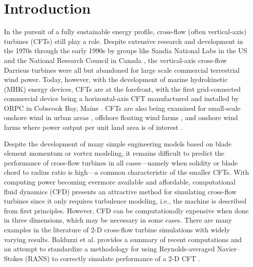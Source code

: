 \documentclass[aip,graphicx]{revtex4-1}
\begin{document}
\pacs{}%

\maketitle %
\listoftodos

\section{Introduction}

In the pursuit of a fully sustainable energy profile, cross-flow (often
vertical-axis) turbines (CFTs) still play a role. Despite extensive research and
development in the 1970s through the early 1990s by groups like Sandia National
Labs in the US \cite{Sutherland2012} and the National Research Council in Canada
\cite{Para2002}, the vertical-axis cross-flow Darrieus turbines were all but
abandoned for large scale commercial terrestrial wind power. Today, however,
with the development of marine hydrokinetic (MHK) energy devices, CFTs are at
the forefront, with the first grid-connected commercial device being a
horizontal-axis CFT manufactured and installed by ORPC in Cobscook Bay, Maine
\cite{ORPC2012}. CFTs are also being examined for small-scale onshore wind in
urban areas \cite{Lott2015}, offshore floating wind farms \cite{Paulsen2011,
    Sandia2012}, and onshore wind farms where power output per unit land area is of
interest \cite{Dabiri2011}.

Despite the development of many simple engineering models based on blade element
momentum or vortex modeling, it remains difficult to predict the performance of
cross-flow turbines in all cases---namely when solidity or blade chord to radius
ratio is high---a common characteristic of the smaller CFTs. With computing
power becoming evermore available and affordable, computational fluid dynamics
(CFD) presents an attractive method for simulating cross-flow turbines since it
only requires turbulence modeling, i.e., the machine is described from first
principles. However, CFD can be computationally expensive when done in three
dimensions, which may be necessary in some cases. There are many examples in the
literature of 2-D cross-flow turbine simulations with widely varying results.
Balduzzi et al. provides a summary of recent computations and an attempt to
standardize a methodology for using Reynolds-averaged Navier--Stokes (RANS) to
correctly simulate performance of a 2-D CFT \cite{Balduzzi2016}.
\end{document}
